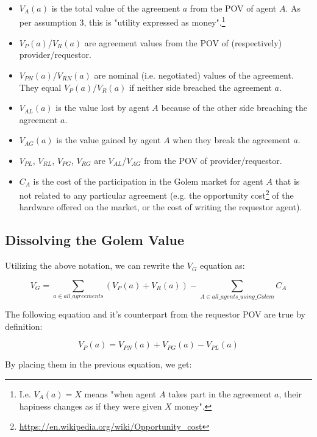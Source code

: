 \documentclass{article}
\begin{document}
\begin{itemize}
\item{$V_A(a)$ is the total value of the agreement $a$ from the POV of agent $A$. As per assumption 3, this is "utility expressed as money".\footnote{
I.e. $V_A(a) = X$ means "when agent $A$ takes part in the agreement $a$, their hapiness changes as if they were given $X$ money".}}
\item{$V_P(a)$/$V_R(a)$ are agreement values from the POV of (respectively) provider/requestor.}
\item{$V_{PN}(a)$/$V_{RN}(a)$ are nominal (i.e. negotiated) values of the agreement. They equal $V_P(a)$/$V_R(a)$ if neither side breached the agreement $a$.}
\item{$V_{AL}(a)$ is the value lost by agent $A$ because of the other side breaching the agreement $a$.}
\item{$V_{AG}(a)$ is the value gained by agent $A$ when they break the agreement $a$.}
\item{$V_{PL}$, $V_{RL}$, $V_{PG}$, $V_{RG}$ are $V_{AL}$/$V_{AG}$ from the POV of provider/requestor.}
\item{$C_A$ is the cost of the participation in the Golem market for agent $A$ that is not related to any particular agreement 
(e.g. the opportunity cost\footnote{\href{https://en.wikipedia.org/wiki/Opportunity\_cost}{https://en.wikipedia.org/wiki/Opportunity\_cost}} of the hardware offered on the market, 
or the cost of writing the requestor agent).}
\end{itemize}

\subsection{Dissolving the Golem Value}

Utilizing the above notation, we can rewrite the $V_G$ equation as:

\begin{equation}
    V_G = \sum_{a \in all\_agreements}(V_P(a) + V_R(a)) - \sum_{A \in all\_agents\_using\_Golem}C_A
\end{equation}

The following equation and it's counterpart from the requestor POV are true by definition:

\begin{equation}
    V_P(a) = V_{PN}(a) + V_{PG}(a) - V_{PL}(a)
\end{equation}

By placing them in the previous equation, we get:
\end{document}
